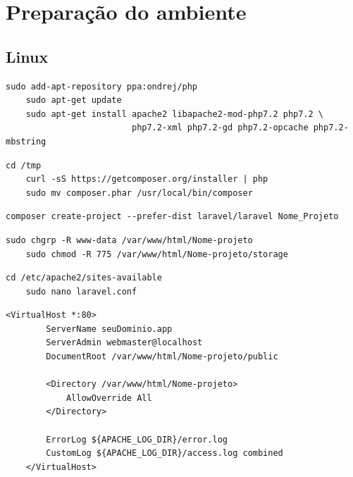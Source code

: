 \documentclass[
12pt,				%
openany,			%
twoside,			%
a4paper,			%
english,			%
french,				%
spanish,			%
brazil,				%
]{abntex2}
\begin{document}
\section{Preparação do ambiente}
\subsection{Linux}

\begin{lstlisting}[style=bash,caption={Instalando Apache e PHP 7.2}]
    sudo add-apt-repository ppa:ondrej/php
    sudo apt-get update
    sudo apt-get install apache2 libapache2-mod-php7.2 php7.2 \
                         php7.2-xml php7.2-gd php7.2-opcache php7.2-mbstring
\end{lstlisting}


\begin{lstlisting}[style=bash,caption={Instalando o Composer (gerenciador de pacotes PHP)}]
    cd /tmp
    curl -sS https://getcomposer.org/installer | php
    sudo mv composer.phar /usr/local/bin/composer
\end{lstlisting}

\begin{lstlisting}[style=bash,caption={Criando novo projeto Laravel}]
    composer create-project --prefer-dist laravel/laravel Nome_Projeto
\end{lstlisting}

\begin{lstlisting}[style=bash,caption={Permissões de acesso no apache}]
    sudo chgrp -R www-data /var/www/html/Nome-projeto
    sudo chmod -R 775 /var/www/html/Nome-projeto/storage
\end{lstlisting}

\begin{lstlisting}[style=bash,caption={Arquivo de configuração do projeto}]
    cd /etc/apache2/sites-available
    sudo nano laravel.conf
\end{lstlisting}

\begin{lstlisting}[style=bash,caption={\textit{laravel.conf}}]
    <VirtualHost *:80>
        ServerName seuDominio.app
        ServerAdmin webmaster@localhost
        DocumentRoot /var/www/html/Nome-projeto/public

        <Directory /var/www/html/Nome-projeto>
            AllowOverride All
        </Directory>

        ErrorLog ${APACHE_LOG_DIR}/error.log
        CustomLog ${APACHE_LOG_DIR}/access.log combined
    </VirtualHost>
\end{lstlisting}
\end{document}
